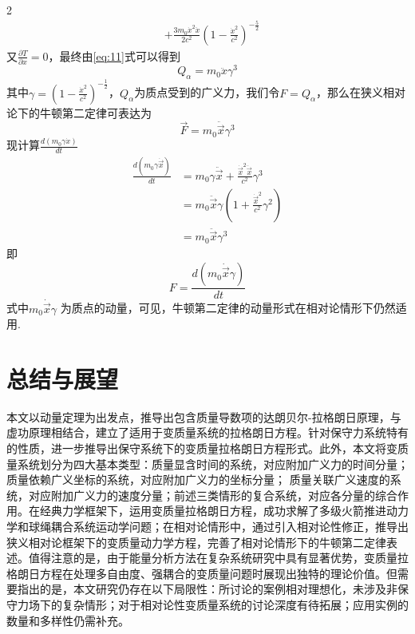 \documentclass[12pt,twoside]{article}
\numberwithin{equation}{section}    %
\begin{document}
\begin{multicols}{2}
\[\begin{split}
            &+\frac{3m_0\dot{x}^2\ddot{x}}{2c^2}\left( 1-\frac{\dot{x}^2}{c^2} \right) ^{-\frac{5}{2}}
        \end{split}
    \]  
    又$\frac{\partial T}{\partial x}=0$，最终由\eqref{eq:11}式可以得到
    \begin{equation}
        Q_{\alpha}=m_0\ddot{x}\gamma ^3
        \label{eq:5.4}
    \end{equation}
    其中$\gamma =\left( 1-\frac{\dot{x}^2}{c^2} \right) ^{-\frac{1}{2}}$，$Q_{\alpha}$为质点受到的广义力，我们令$F=Q_{\alpha}$，那么在狭义相对论下的牛顿第二定律可表达为
    \begin{equation}
        \vec{F}=m_0\ddot{\vec{x}}\gamma ^3
        \label{eq:5.5}
    \end{equation}
    现计算$\frac{d\left( m_0\gamma \dot{x} \right)}{dt}$
    \[
    \begin{split}
        \frac{d\left( m_0\gamma \dot{\vec{x}} \right)}{dt}&=m_0\gamma \ddot{\vec{x}}+\frac{\dot{\vec{x}}^2\ddot{\vec{x}}}{c^2}\gamma ^3
        \\
        &=m_0\ddot{\vec{x}}\gamma \left( 1+\frac{\dot{\vec{x}}^2}{c^2}\gamma ^2 \right) 
        \\
        &=m_0\ddot{\vec{x}}\gamma ^3
    \end{split}
    \]
    即
    \begin{equation}
        F=\frac{d\left( m_0\dot{\vec{x}}\gamma \right)}{dt}
        \label{eq:5.6}
    \end{equation}
    式中$m_0\dot{\vec{x}}\gamma $ 为质点的动量，可见，牛顿第二定律的动量形式在相对论情形下仍然适用.

    \section{总结与展望}
    本文以动量定理为出发点，推导出包含质量导数项的达朗贝尔-拉格朗日原理，与虚功原理相结合，建立了适用于变质量系统的拉格朗日方程。针对保守力系统特有的性质，进一步推导出保守系统下的变质量拉格朗日方程形式。此外，本文将变质量系统划分为四大基本类型：质量显含时间的系统，对应附加广义力的时间分量；质量依赖广义坐标的系统，对应附加广义力的坐标分量； 质量关联广义速度的系统，对应附加广义力的速度分量；前述三类情形的复合系统，对应各分量的综合作用。在经典力学框架下，运用变质量拉格朗日方程，成功求解了多级火箭推进动力学和球绳耦合系统运动学问题；在相对论情形中，通过引入相对论性修正，推导出狭义相对论框架下的变质量动力学方程，完善了相对论情形下的牛顿第二定律表述。值得注意的是，由于能量分析方法在复杂系统研究中具有显著优势，变质量拉格朗日方程在处理多自由度、强耦合的变质量问题时展现出独特的理论价值。但需要指出的是，本文研究仍存在以下局限性：所讨论的案例相对理想化，未涉及非保守力场下的复杂情形；对于相对论性变质量系统的讨论深度有待拓展；应用实例的数量和多样性仍需补充。

    
    

\end{multicols}
\end{document}
